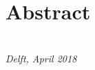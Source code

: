 \chapter*{Abstract}\label{chap:abstract}




\begin{flushright}
{\makeatletter\itshape
    \@author \\
    Delft, April 2018
\makeatother}
\end{flushright}
